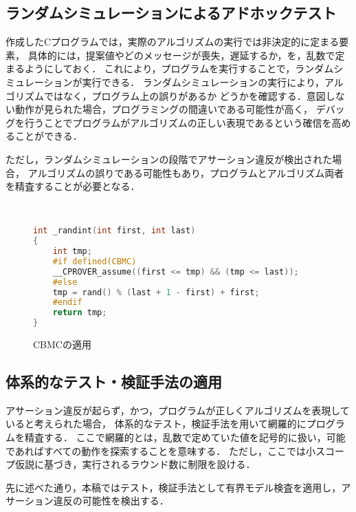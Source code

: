 \documentclass[technicalreport]{ieicej}
\theoremstyle{plain}
\begin{document}
\subsection{ランダムシミュレーションによるアドホックテスト}

作成したCプログラムでは，実際のアルゴリズムの実行では非決定的に定まる要素，
具体的には，提案値やどのメッセージが喪失，遅延するか，を，乱数で定まるようにしておく．
これにより，プログラムを実行することで，ランダムシミュレーションが実行できる．
ランダムシミュレーションの実行により，アルゴリズムではなく，プログラム上の誤りがあるか
どうかを確認する．意図しない動作が見られた場合，プログラミングの間違いである可能性が高く，
デバッグを行うことでプログラムがアルゴリズムの正しい表現であるという確信を高めることができる．

ただし，ランダムシミュレーションの段階でアサーション違反が検出された場合，
アルゴリズムの誤りである可能性もあり，プログラムとアルゴリズム両者を精査することが必要となる．

\begin{figure}[t]
    \centering　{\scriptsize
\begin{lstlisting}[language=c]
int _randint(int first, int last)
{
    int tmp;
    #if defined(CBMC)
    __CPROVER_assume((first <= tmp) && (tmp <= last));
    #else
    tmp = rand() % (last + 1 - first) + first;
    #endif
    return tmp;
}
\end{lstlisting}}

        \caption{CBMCの適用}\label{fig:cbmc}
    \end{figure}          
 

\subsection{体系的なテスト・検証手法の適用}

アサーション違反が起らず，かつ，プログラムが正しくアルゴリズムを表現していると考えられた場合，
体系的なテスト，検証手法を用いて網羅的にプログラムを精査する．
ここで網羅的とは，乱数で定めていた値を記号的に扱い，可能であればすべての動作を探索することを意味する．
ただし，ここでは小スコープ仮説に基づき，実行されるラウンド数に制限を設ける．

先に述べた通り，本稿ではテスト，検証手法として有界モデル検査を適用し，アサーション違反の可能性を検出する．

\end{document}
